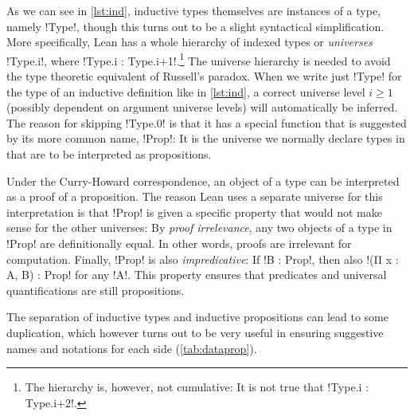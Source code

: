 As we can see in \autoref{lst:ind}, inductive types themselves are instances of
a type, namely \lean!Type!, though this turns out to be a slight syntactical simplification.
More specifically, Lean has a whole hierarchy of indexed types
or \emph{universes} \lean!Type.{i}!, where \lean!Type.{i} :
Type.{i+1}!.\footnote{The hierarchy is, however, not cumulative: It is not true
  that \lean!Type.{i} : Type.{i+2}!.} The universe hierarchy is needed to avoid
the type theoretic equivalent of Russell's paradox. When we write just
\lean!Type! for the type of an inductive definition like in \autoref{lst:ind},
a correct universe level $i \ge 1$
(possibly dependent on argument universe levels) will automatically be inferred.
The reason for skipping \lean!Type.{0}! is that it has a special function that
is suggested by its more common name, \lean!Prop!: It is the universe we normally
declare types in that are to be interpreted as propositions.

Under the Curry-Howard correspondence, an object of a type can be interpreted as
a proof of a proposition. The reason Lean uses a separate universe for this
interpretation is that \lean!Prop! is given a specific property that would not
make sense for the other universes: By \emph{proof irrelevance}, any two
objects of a type in \lean!Prop! are definitionally equal. In other words,
proofs are irrelevant for computation. Finally, \lean!Prop! is also
\emph{impredicative}: If \lean!B : Prop!, then also \lean!(Π x : A, B) : Prop!
for any \lean!A!. This property ensures that predicates and universal
quantifications are still propositions.

The separation of inductive types and inductive propositions can lead to some duplication, which
however turns out to be very useful in ensuring suggestive names and notations
for each side (\autoref{tab:dataprop}).

